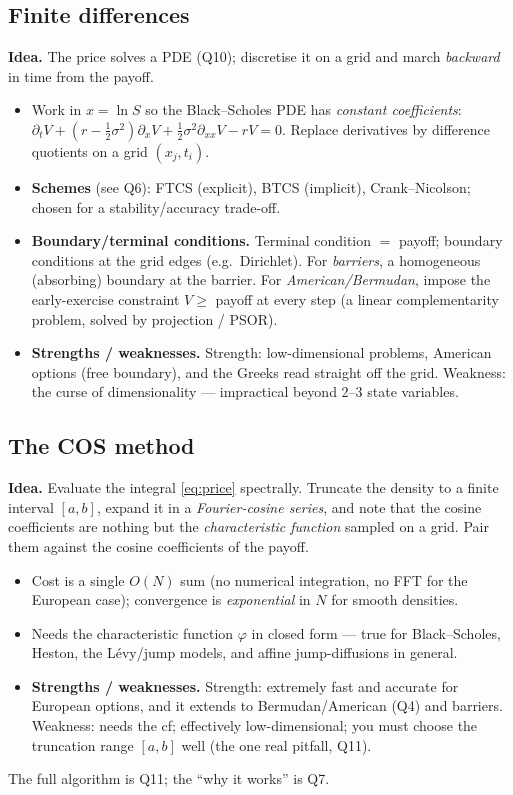 \documentclass[11pt]{article}
\newcommand{\ch}{\varphi}
\begin{document}
\subsection{Finite differences}
\textbf{Idea.} The price solves a PDE (Q10); discretise it on a grid and march \emph{backward} in time from
the payoff.
\begin{itemize}
  \item Work in $x=\ln S$ so the Black--Scholes PDE has \emph{constant coefficients}:
  $\partial_t V+(r-\tfrac12\sigma^2)\partial_x V+\tfrac12\sigma^2\partial_{xx}V-rV=0$. Replace derivatives by
  difference quotients on a grid $(x_j,t_i)$.
  \item \textbf{Schemes} (see Q6): FTCS (explicit), BTCS (implicit), Crank--Nicolson; chosen for a
  stability/accuracy trade-off.
  \item \textbf{Boundary/terminal conditions.} Terminal condition $=$ payoff; boundary conditions at the grid
  edges (e.g.\ Dirichlet). For \emph{barriers}, a homogeneous (absorbing) boundary at the barrier. For
  \emph{American/Bermudan}, impose the early-exercise constraint $V\ge$ payoff at every step (a linear
  complementarity problem, solved by projection / PSOR).
  \item \textbf{Strengths / weaknesses.} Strength: low-dimensional problems, American options (free boundary),
  and the Greeks read straight off the grid. Weakness: the curse of dimensionality --- impractical beyond
  $2$--$3$ state variables.
\end{itemize}

\subsection{The COS method}
\textbf{Idea.} Evaluate the integral \eqref{eq:price} spectrally. Truncate the density to a finite interval
$[a,b]$, expand it in a \emph{Fourier-cosine series}, and note that the cosine coefficients are nothing but
the \emph{characteristic function} sampled on a grid. Pair them against the cosine coefficients of the payoff.
\begin{itemize}
  \item Cost is a single $O(N)$ sum (no numerical integration, no FFT for the European case); convergence is
  \emph{exponential} in $N$ for smooth densities.
  \item Needs the characteristic function $\ch$ in closed form --- true for Black--Scholes, Heston, the
  L\'evy/jump models, and affine jump-diffusions in general.
  \item \textbf{Strengths / weaknesses.} Strength: extremely fast and accurate for European options, and it
  extends to Bermudan/American (Q4) and barriers. Weakness: needs the cf; effectively low-dimensional; you
  must choose the truncation range $[a,b]$ well (the one real pitfall, Q11).
\end{itemize}
The full algorithm is Q11; the ``why it works'' is Q7.
\end{document}
